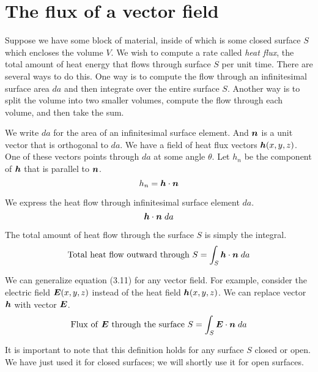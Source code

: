 \section{The flux of a vector field}

Suppose we have some block of material, inside of which is
some closed surface $S$ which encloses the volume $V$.
We wish to compute a rate called \emph{heat flux}, 
the total amount of heat energy that flows through surface $S$ per unit time.
There are several ways to do this.
One way is to compute the flow through an infinitesimal surface area $da$ 
and then integrate over the entire surface $S$.
Another way is to split the volume into two smaller volumes,
compute the flow through each volume, and then take the sum.

We write $da$ for the area of an infinitesimal surface element.
And $\boldsymbol{n}$ is a unit vector that is orthogonal to $da$.
We have a field of heat flux vectors $\boldsymbol{h}(x,y,z)$.
One of these vectors points through $da$ at some angle $\theta$.
Let $h_n$ be the component of $\boldsymbol{h}$ that is parallel to $\boldsymbol{n}$.
\begin{equation}
  h_n = \boldsymbol{h} \cdot \boldsymbol{n}
\end{equation}

We express the heat flow through infinitesimal surface element $da$.
\begin{equation}
  \boldsymbol{h} \cdot \boldsymbol{n} \; da
\end{equation}

The total amount of heat flow through the surface $S$ is simply the integral.
\begin{equation}
  \mathrm{Total\ heat\ flow\ outward\ through\ }S = \int_S \bv{h} \cdot \bv{n} \; da
\end{equation}

We can generalize equation (3.11) for any vector field.
For example, consider the electric field $\boldsymbol{E}(x,y,z)$ instead of the heat field $\boldsymbol{h}(x,y,z)$.
We can replace vector $\boldsymbol{h}$ with vector $\boldsymbol{E}$.
\begin{equation}
  \mathrm{Flux\ of\ } \bv{E} \mathrm{\ through\ the\ surface\ }S = \int_S \bv{E} \cdot \bv{n} \; da
\end{equation}

It is important to note that this definition holds for any surface $S$ closed or open.
We have just used it for closed surfaces; we will shortly use it for open surfaces.

